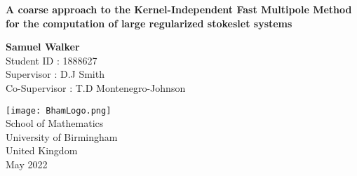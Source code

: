 \begin{titlepage}
    \begin{center}
        \vspace*{1cm}

        \LARGE
        \textbf{A coarse approach to the Kernel-Independent Fast Multipole Method for the computation of large regularized stokeslet systems}

        \normalsize
        
        \vspace{1.5cm}
        
        \textbf{Samuel Walker}\\
        Student ID : 1888627 \\
        Supervisor : D.J Smith \\
        Co-Supervisor : T.D Montenegro-Johnson
        
        \vfill
        
        \vspace{0.8cm}
        
        \texttt{[image: BhamLogo.png]}\\
        
        \normalsize
        School of Mathematics\\
        University of Birmingham\\
        United Kingdom\\
        May 2022
            
    \end{center}
\end{titlepage}



